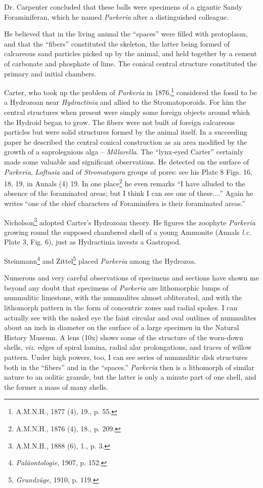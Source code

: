 \documentclass[a4paper, 12pt, oneside]{article}
\begin{document}
Dr. Carpenter concluded that these balls were specimens of a gigantic Sandy Foraminiferan, which he named \emph{Parkeria} after a distinguished colleague.

He believed that in the living animal the ``spaces'' were filled with protoplasm, and that the ``fibers'' constituted the skeleton, the latter being formed of calcareous sand particles picked up by the animal, and held together by a cement of carbonate and phosphate of lime. The conical central structure constituted the primary and initial chambers.

Carter, who took up the problem of \emph{Parkeria} in 1876,\footnote{A.M.N.H., 1877 (4), 19., p. 55.} considered the fossil to be a Hydrozoan near \emph{Hydractinia} and allied to the Stromatoporoids. For him the central structures when present were simply some foreign objects around which the Hydroid began to grow. The fibers were not built of foreign calcareous particles but were solid structures formed by the animal itself. In a succeeding paper he described the central conical construction as an area modified by the growth of a saprolegnious alga -- \emph{Millarella}. The ``lynx-eyed Carter'' certainly made some valuable and significant observations. He detected on the surface of \emph{Parkeria}, \emph{Loftusia} and of \emph{Stromatopora} groups of pores: see his Plate 8 Figs. 16, 18, 19, in Annals (4) 19. In one place\footnote{A.M.N.H., 1876 (4), 18., p. 209.} he even remarks ``I have alluded to the absence of the foraminated areas; but I think I can see one of these....'' Again he writes ``one of the chief characters of Foraminifera is their foraminated areas.''

Nicholson\footnote{A.M.N.H., 1888 (6), 1., p. 3.} adopted Carter's Hydrozoan theory. He figures the zoophyte \emph{Parkeria} growing round the supposed chambered shell of a young Ammonite (Annals \emph{l.c.} Plate 3, Fig. 6), just as Hydractinia invests a Gastropod.

Steinmann\footnote{\emph{Paläontologie}, 1907, p. 152.} and Zittel\footnote{\emph{Grundzüge}, 1910, p. 119.} placed \emph{Parkeria} among the Hydrozoa.

Numerous and very careful observations of specimens and sections have shown me beyond any doubt that specimens of \emph{Parkeria} are lithomorphic lumps of nummulitic limestone, with the nummulites almost obliterated, and with the lithomorph pattern in the form of concentric zones and radial spokes. I can actually see with the naked eye the faint circular and oval outlines of nummulites about an inch in diameter on the surface of a large specimen in the Natural History Museum. A lens (10x) shows some of the structure of the worn-down shells, \emph{viz.} edges of spiral lamina, radial alar prolongations, and traces of willow pattern. Under high powers, too, I can see series of nummulitic disk structures both in the ``fibers'' and in the ``spaces.'' \emph{Parkeria} then is a lithomorph of similar nature to an oolitic granule, but the latter is only a minute part of one shell, and the former a mass of many shells.
\end{document}
